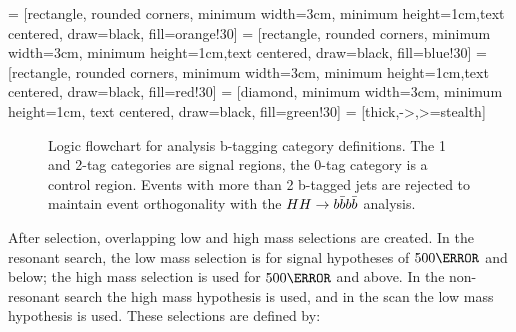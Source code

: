  = [rectangle, rounded corners, minimum width=3cm, minimum height=1cm,text centered, draw=black, fill=orange!30]
 = [rectangle, rounded corners, minimum width=3cm, minimum height=1cm,text centered, draw=black, fill=blue!30]
 = [rectangle, rounded corners, minimum width=3cm, minimum height=1cm,text centered, draw=black, fill=red!30]
 = [diamond, minimum width=3cm, minimum height=1cm, text centered, draw=black, fill=green!30]
 = [thick,->,>=stealth]
\begin{figure}[htbp]
  \centering
  \caption[Logic flowchart for analysis b-tagging category definitions]{Logic flowchart for analysis b-tagging category definitions. The 1 and 2-tag categories are signal regions, the 0-tag category is a control region. Events with more than 2 b-tagged jets are rejected to maintain event orthogonality with the $HH\rightarrow b\bar{b}b\bar{b}$ analysis.}
  \label{fig:btag-logic}
\end{figure}

After selection, overlapping low and high mass selections are created. In the resonant search, the low mass selection is for signal hypotheses of $\unit{500}{\GeV}$ and below; the high mass selection is used for $\unit{500}{\GeV}$ and above. In the non-resonant search the high mass hypothesis is used, and in the \klambda scan the low mass hypothesis is used. These selections are defined by:

